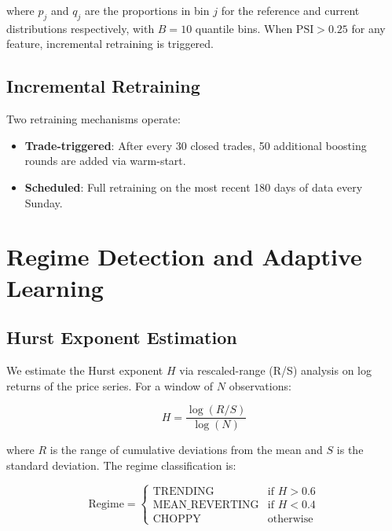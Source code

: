 \documentclass[12pt,a4paper]{article}
\begin{document}
where $p_j$ and $q_j$ are the proportions in bin $j$ for the reference and current distributions respectively, with $B=10$ quantile bins. When $\text{PSI} > 0.25$ for any feature, incremental retraining is triggered.

\subsection{Incremental Retraining}

Two retraining mechanisms operate:
\begin{itemize}[leftmargin=*]
    \item \textbf{Trade-triggered}: After every 30 closed trades, 50 additional boosting rounds are added via warm-start.
    \item \textbf{Scheduled}: Full retraining on the most recent 180 days of data every Sunday.
\end{itemize}

\section{Regime Detection and Adaptive Learning}
\label{sec:regime}

\subsection{Hurst Exponent Estimation}

We estimate the Hurst exponent $H$ via rescaled-range (R/S) analysis on log returns of the price series. For a window of $N$ observations:

\begin{equation}
    H = \frac{\log(R/S)}{\log(N)}
\end{equation}

where $R$ is the range of cumulative deviations from the mean and $S$ is the standard deviation. The regime classification is:

\begin{equation}
    \text{Regime} = \begin{cases}
        \text{TRENDING} & \text{if } H > 0.6 \\
        \text{MEAN\_REVERTING} & \text{if } H < 0.4 \\
        \text{CHOPPY} & \text{otherwise}
    \end{cases}
\end{equation}
\end{document}
